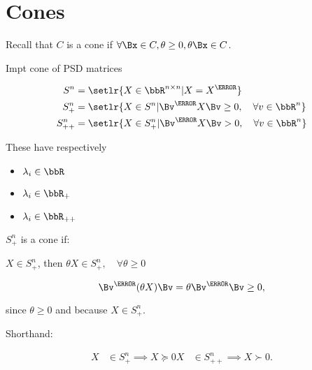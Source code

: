 
\section{Cones}

Recall that \( C \) is a cone if \( \forall \Bx \in C, \theta \ge 0, \theta \Bx \in C \).

Impt cone of PSD matrices

\begin{dmath}\label{eqn:convexOptimizationLecture4:400}
\begin{aligned}
S^n &= \setlr{ X \in \bbR^{n \times n} | X = X^\T } \\
S^n_{+} &= \setlr{ X \in S^n | \Bv^\T X \Bv \ge 0, \quad \forall v \in \bbR^n } \\
S^n_{++} &= \setlr{ X \in S^n_{+} | \Bv^\T X \Bv > 0, \quad \forall v \in \bbR^n } \\
\end{aligned}
\end{dmath}

These have respectively

\begin{itemize}
\item \( \lambda_i \in \bbR \)
\item \( \lambda_i \in \bbR_{+} \)
\item \( \lambda_i \in \bbR_{++} \)
\end{itemize}

\( S^n_{+} \) is a cone if:

\( X \in S^n_{+}\), then \( \theta X \in S^n_{+}, \quad \forall \theta \ge 0 \)

\begin{dmath}\label{eqn:convexOptimizationLecture4:420}
\Bv^\T (\theta X) \Bv
= \theta \Bv^\T \Bv
\ge 0,
\end{dmath}

since \( \theta \ge 0 \) and because \( X \in S^n_{+} \).

Shorthand:

\begin{dmath}\label{eqn:convexOptimizationLecture4:440}
\begin{aligned}
X &\in S^n_{+} \implies X \succeq 0
X &\in S^n_{++} \implies X \succ 0.
\end{aligned}
\end{dmath}

